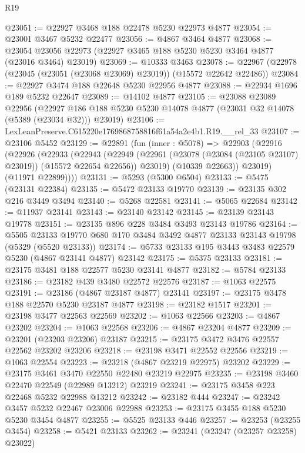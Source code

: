 \begin{lexlean}{R19}
\begin{coremodule}
@23051 := @22927 @3468 @188 @22478 @5230 @22973 @4877
@23054 := @23001 @3467 @5232 @22477
@23056 := @4867 @3464 @4877
@23068 := @23054 @23056 @22973 (@22927 @3465 @188 @5230 @5230 @3464 @4877 (@23016 @3464) @23019)
@23069 := @10333 @3463
@23078 := @22967 (@22978 (@23045 (@23051 (@23068 @23069) @23019)) (@15572 @22642 @22486))
@23084 := @22927 @3474 @188 @22648 @5230 @22956 @4877
@23088 := @22934 @1696 @189 @5232 @22647
@23089 := @14102 @4877
@23105 := @23088
    @23089
    @22956
    (@22927 @186 @188 @5230 @5230 @14078 @4877 (@23031 @32 @14078 (@5389 (@23034 @32))) @23019)
@23106 := LexLeanPreserve.C615220e1769868758816f61a54a2e4b1.R19.__rel_33
@23107 := @23106 @5452
@23129 := @22891
    (fun (inner : @5078) =>
    @22903
      (@22916
        (@22926
          (@22933
            (@22943
              (@22949
                (@22961 (@23078 (@23084 (@23105 @23107) @23019)) (@15572 @22654 @22656))
                @23019)
              (@10339 @22663))
            @23019)
          (@11971 @22899))))
@23131 := @5293 (@5300 @6504)
@23133 := @5475 (@23131 @22384)
@23135 := @5472 @23133 @19770
@23139 := @23135 @302 @216 @3449 @3494
@23140 := @5268 @22581
@23141 := @5065 @22684
@23142 := @11937 @23141
@23143 := @23140 @23142
@23145 := @23139 @23143 @19778
@23151 := @23135 @896 @228 @3484 @3493 @23143 @19786
@23164 := @5505
    @23133
    @19770
    @680
    @170
    @3484
    @3492
    @4877
    @23133
    @23143
    @19798
    (@5329 (@5520 @23133))
@23174 := @5733 @23133 @195 @3443 @3483 @22579 @5230 (@4867 @23141 @4877) @23142
@23175 := @5375 @23133
@23181 := @23175 @3481 @188 @22577 @5230 @23141 @4877
@23182 := @5784 @23133
@23186 := @23182 @439 @3480 @22572 @22576
@23187 := @1063 @22575
@23191 := @23186 (@4867 @23187 @4877) @23141
@23197 := @23175 @3478 @188 @22570 @5230 @23187 @4877
@23198 := @23182 @1517
@23201 := @23198 @3477 @22563 @22569
@23202 := @1063 @22566
@23203 := @4867 @23202
@23204 := @1063 @22568
@23206 := @4867 @23204 @4877
@23209 := @23201 (@23203 @23206) @23187
@23215 := @23175 @3472 @3476 @22557 @22562 @23202 @23206
@23218 := @23198 @3471 @22552 @22556
@23219 := @1063 @22554
@23223 := @23218 (@4867 @23219 @22975) @23202
@23229 := @23175 @3461 @3470 @22550 @22480 @23219 @22975
@23235 := @23198 @3460 @22470 @22549 (@22989 @13212) @23219
@23241 := @23175 @3458 @223 @22468 @5232 @22988 @13212
@23242 := @23182 @444
@23247 := @23242 @3457 @5232 @22467 @23006 @22988
@23253 := @23175 @3455 @188 @5230 @5230 @3454 @4877
@23255 := @5525 @23133 @446
@23257 := @23253 (@23255 @3454)
@23258 := @5421 @23133
@23262 := @23241 (@23247 (@23257 @23258) @23022)

\end{coremodule}
\end{lexlean}
